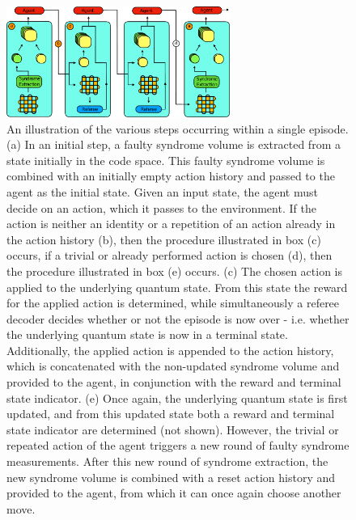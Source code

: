 \documentclass[twocolumn,preprintnumbers,amsmath,amssymb,notitlepage,nofootinbib,longbibliography,superscriptaddress,aps,pra,10pt]{revtex4-1}
\begin{document}
	\begin{figure}
		\centering
		\includegraphics[width=0.65\textwidth]{figures/decoding_as_rl.pdf}
		\caption{
			An illustration of the various steps occurring within a single episode.
			(a) In an initial step, a faulty syndrome volume is extracted from a state initially in the code space.
			This faulty syndrome volume is combined with an initially empty action history and passed to the agent as the initial state.
			Given an input state, the agent must decide on an action, which it passes to the environment.
			If the action is neither an identity or a repetition of an action already in the action history (b), then the procedure illustrated in box (c) occurs, if a trivial or already performed action is chosen (d), then the procedure illustrated in box (e) occurs.
			(c) The chosen action is applied to the underlying quantum state.
			From this state the reward for the applied action is determined, while simultaneously a referee decoder decides whether or not the episode is now over - i.e.
			whether the underlying quantum state is now in a terminal state.
			Additionally, the applied action is appended to the action history, which is concatenated with the non-updated syndrome volume and provided to the agent, in conjunction with the reward and terminal state indicator.
			(e) Once again, the underlying quantum state is first updated, and from this updated state both a reward and terminal state indicator are determined (not shown).
			However, the trivial or repeated action of the agent triggers a new round of faulty syndrome measurements.
			After this new round of syndrome extraction, the new syndrome volume is combined with a reset action history and provided to the agent, from which it can once again choose another move.
		}
		\label{f:single_episode}
	\end{figure}
\end{document}
